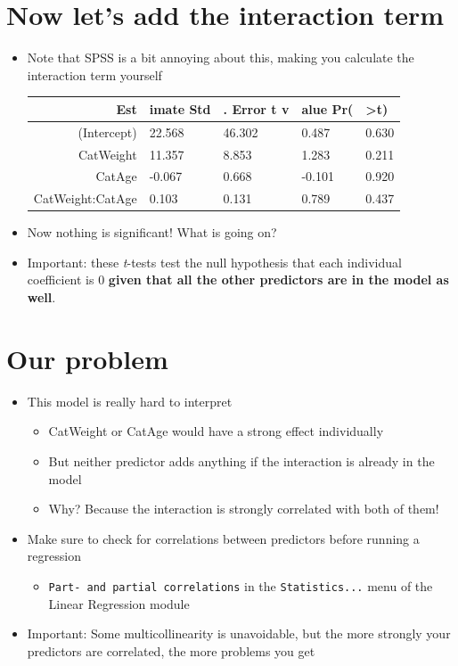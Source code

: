 \documentclass[]{article}
\providecommand{\tightlist}{%
  \setlength{\itemsep}{0pt}\setlength{\parskip}{0pt}}
\begin{document}
\section{Now let's add the interaction
term}\label{now-lets-add-the-interaction-term}

\begin{itemize}
\item
  Note that SPSS is a bit annoying about this, making you calculate the
  interaction term yourself

  \begin{longtable}[]{@{}rllll@{}}
  \toprule
  Est & imate Std & . Error t v & alue Pr( &
  \textgreater{}\textbar{}t\textbar{})\tabularnewline
  \midrule
  \endhead
  (Intercept) & 22.568 & 46.302 & 0.487 & 0.630\tabularnewline
  CatWeight & 11.357 & 8.853 & 1.283 & 0.211\tabularnewline
  CatAge & -0.067 & 0.668 & -0.101 & 0.920\tabularnewline
  CatWeight:CatAge & 0.103 & 0.131 & 0.789 & 0.437\tabularnewline
  \bottomrule
  \end{longtable}
\item
  Now nothing is significant! What is going on?
\item
  Important: these \emph{t}-tests test the null hypothesis that each
  individual coefficient is 0 \textbf{given that all the other
  predictors are in the model as well}.
\end{itemize}

\section{Our problem}\label{our-problem}

\begin{itemize}
\tightlist
\item
  This model is really hard to interpret

  \begin{itemize}
  \tightlist
  \item
    CatWeight or CatAge would have a strong effect individually
  \item
    But neither predictor adds anything if the interaction is already in
    the model
  \item
    Why? Because the interaction is strongly correlated with both of
    them!
  \end{itemize}
\item
  Make sure to check for correlations between predictors before running
  a regression

  \begin{itemize}
  \tightlist
  \item
    \texttt{Part-\ and\ partial\ correlations} in the
    \texttt{Statistics...} menu of the Linear Regression module
  \end{itemize}
\item
  Important: Some multicollinearity is unavoidable, but the more
  strongly your predictors are correlated, the more problems you get
\end{itemize}
\end{document}
